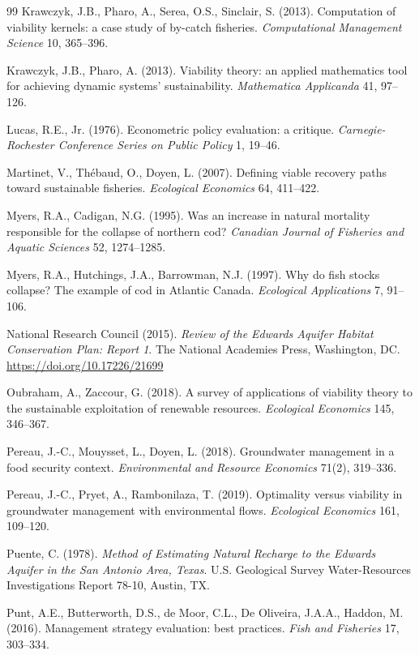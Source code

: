 \begin{thebibliography}{99}
 Krawczyk, J.B., Pharo, A., Serea, O.S., Sinclair, S. (2013). Computation of viability kernels: a case study of by-catch fisheries. \emph{Computational Management Science} 10, 365--396.

 Krawczyk, J.B., Pharo, A. (2013). Viability theory: an applied mathematics tool for achieving dynamic systems' sustainability. \emph{Mathematica Applicanda} 41, 97--126.

 Lucas, R.E., Jr. (1976). Econometric policy evaluation: a critique. \emph{Carnegie-Rochester Conference Series on Public Policy} 1, 19--46.

 Martinet, V., Th\'ebaud, O., Doyen, L. (2007). Defining viable recovery paths toward sustainable fisheries. \emph{Ecological Economics} 64, 411--422.

 Myers, R.A., Cadigan, N.G. (1995). Was an increase in natural mortality responsible for the collapse of northern cod? \emph{Canadian Journal of Fisheries and Aquatic Sciences} 52, 1274--1285.

 Myers, R.A., Hutchings, J.A., Barrowman, N.J. (1997). Why do fish stocks collapse? The example of cod in Atlantic Canada. \emph{Ecological Applications} 7, 91--106.

 National Research Council (2015). \emph{Review of the Edwards Aquifer Habitat Conservation Plan: Report 1}. The National Academies Press, Washington, DC. \url{https://doi.org/10.17226/21699}

 Oubraham, A., Zaccour, G. (2018). A survey of applications of viability theory to the sustainable exploitation of renewable resources. \emph{Ecological Economics} 145, 346--367.

 Pereau, J.-C., Mouysset, L., Doyen, L. (2018). Groundwater management in a food security context. \emph{Environmental and Resource Economics} 71(2), 319--336.

 Pereau, J.-C., Pryet, A., Rambonilaza, T. (2019). Optimality versus viability in groundwater management with environmental flows. \emph{Ecological Economics} 161, 109--120.

 Puente, C. (1978). \emph{Method of Estimating Natural Recharge to the Edwards Aquifer in the San Antonio Area, Texas}. U.S. Geological Survey Water-Resources Investigations Report 78-10, Austin, TX.

 Punt, A.E., Butterworth, D.S., de Moor, C.L., De Oliveira, J.A.A., Haddon, M. (2016). Management strategy evaluation: best practices. \emph{Fish and Fisheries} 17, 303--334.


\end{thebibliography}
